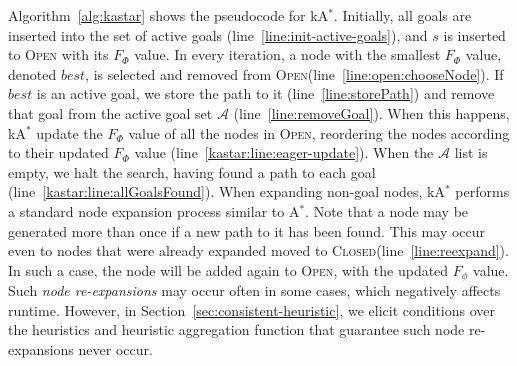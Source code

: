\documentclass[smallextended]{svjour3}       %
\newcommand{\astar}{A$^*$\xspace}
\newcommand{\kastar}{kA$^*$\xspace}
\newcommand{\open}{\textsc{Open}\xspace}
\newcommand{\closed}{\textsc{Closed}\xspace}
\newcommand{\activeg}{\mathcal{A}}
\newcommand{\vect}[1]{\mathbf{#1}}
\begin{document}
Algorithm~\ref{alg:kastar} shows the pseudocode for \kastar. 
Initially, all goals are inserted into the set of active goals (line~\ref{line:init-active-goals}), and $s$ is inserted to \open with its $F_\Phi$ value. 
In every iteration, a node with the smallest $F_\Phi$ value, denoted $\mathit{best}$, is selected and removed from \open (line~\ref{line:open:chooseNode}). 
If $\mathit{best}$ is an active goal, we store the path to it (line~\ref{line:storePath}) and remove that goal from the active goal set $\activeg$ (line~\ref{line:removeGoal}). 
When this happens, \kastar update the $F_\Phi$ value of all the nodes in \open, reordering the nodes according to their updated $F_\Phi$ value 
 (line~\ref{kastar:line:eager-update}).
When the $\activeg$ list is empty, we halt the search, having found a path to each goal (line~\ref{kastar:line:allGoalsFound}).
When expanding non-goal nodes, \kastar performs a standard node expansion process similar to \astar. 
Note that a node may be generated more than once if a new path to it has been found. This may occur even to nodes that were already expanded moved to \closed (line~\ref{line:reexpand}). In such a case, the node will be added again to \open, with the updated $F_\phi$ value. Such \emph{node re-expansions} may occur often in some cases, which negatively affects runtime. However, in Section~\ref{sec:consistent-heuristic}, we elicit conditions over the heuristics and heuristic aggregation function that guarantee such node re-expansions never occur. 
\end{document}
